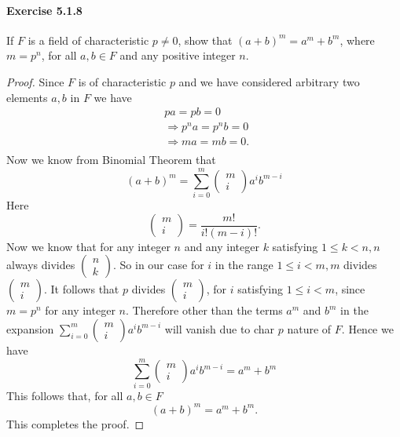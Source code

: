 \documentclass{article}
\begin{document}
\paragraph{Exercise 5.1.8} If $F$ is a field of characteristic $p \neq 0$, show that $(a + b)^m = a^m + b^m$, where $m = p^n$, for all $a, b \in F$ and any positive integer $n$.
\begin{proof}
    Since $F$ is of characteristic $p$ and we have considered arbitrary two elements $a, b$ in $F$ we have
$$
\begin{aligned}
& p a=p b=0 \\
& \Longrightarrow p^n a=p^n b=0 \\
& \Longrightarrow m a=m b=0 \text {. } \\
&
\end{aligned}
$$
Now we know from Binomial Theorem that
$$
(a+b)^m=\sum_{i=0}^m\left(\begin{array}{c}
m \\
i
\end{array}\right) a^i b^{m-i}
$$
Here
$$
\left(\begin{array}{c}
m \\
i
\end{array}\right)=\frac{m !}{i !(m-i) !} .
$$
Now we know that for any integer $n$ and any integer $k$ satisfying $1 \leq k<n, n$ always divides $\left(\begin{array}{l}n \\ k\end{array}\right)$. So in our case for $i$ in the range $1 \leq i<m, m$ divides $\left(\begin{array}{c}m \\ i\end{array}\right)$. It follows that $p$ divides $\left(\begin{array}{c}m \\ i\end{array}\right)$, for $i$ satisfying $1 \leq i<m$, since $m=p^n$ for any integer $n$. Therefore other than the terms $a^m$ and $b^m$ in the expansion $\sum_{i=0}^m\left(\begin{array}{c}m \\ i\end{array}\right) a^i b^{m-i}$ will vanish due to char $p$ nature of $F$.
Hence we have
$$
\sum_{i=0}^m\left(\begin{array}{c}
m \\
i
\end{array}\right) a^i b^{m-i}=a^m+b^m
$$
This follows that, for all $a, b \in F$
$$
(a+b)^m=a^m+b^m .
$$
This completes the proof.
\end{proof}
\end{document}
